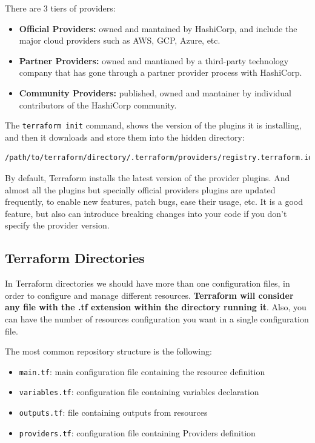 \documentclass{article}
\newenvironment{codetemplate}[1][]{%
  \mybasecolorbox[#1]
  \itshape
}{%
  \endmybasecolorbox
}
\begin{document}
There are 3 tiers of providers:

\begin{itemize}
    \item \textbf{Official Providers:} owned and mantained by HashiCorp, and include the major cloud providers such as AWS, GCP, Azure, etc.
    \item \textbf{Partner Providers:} owned and mantianed by a third-party technology company that has gone through a partner provider process with HashiCorp.
    \item \textbf{Community Providers:} published, owned and mantainer by individual contributors of the HashiCorp community.
\end{itemize}

The \verb+terraform init+ command, shows the version of the plugins it is installing, and then it downloads and store them into the hidden directory:
\begin{codetemplate}{}
\begin{verbatim}
/path/to/terraform/directory/.terraform/providers/registry.terraform.io/hashicorp/
\end{verbatim}
\end{codetemplate} 

By default, Terraform installs the latest version of the provider plugins. And almost all the plugins but specially official providers plugins are updated frequently, to enable new features, patch bugs, ease their usage, etc. It is a good feature, but also can introduce breaking changes into your code if you don't specify the provider version.

\subsection{Terraform Directories}

In Terraform directories we should have more than one configuration files, in order to configure and manage different resources. \textbf{Terraform will consider any file with the .tf extension within the directory running it}. Also, you can have the number of resources configuration you want in a single configuration file.

The most common repository structure is the following:

\begin{itemize}
    \item \verb+main.tf+: main configuration file containing the resource definition
    \item \verb+variables.tf+: configuration file containing variables declaration
    \item \verb+outputs.tf+: file containing outputs from resources
    \item \verb+providers.tf+: configuration file containing Providers definition
\end{itemize}
\end{document}
